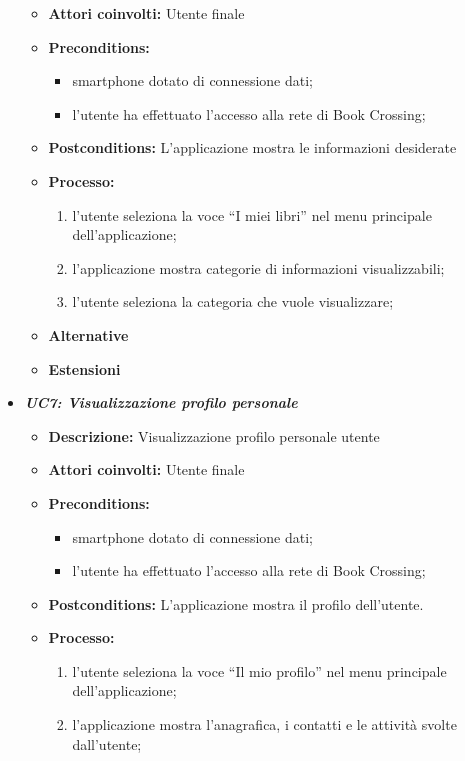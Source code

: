 \begin{itemize}
\begin{itemize}
		\item \textbf{Attori coinvolti:} Utente finale
		\item \textbf{Preconditions:}
		\begin{itemize}
			\item smartphone dotato di connessione dati;
			\item l’utente ha effettuato l’accesso alla rete di Book Crossing;
		\end{itemize}
		\item \textbf{Postconditions:} L’applicazione mostra le informazioni desiderate
		\item \textbf{Processo:}
		\begin{enumerate}
			\item l’utente seleziona la voce “I miei libri” nel menu principale dell’applicazione;
			\item l’applicazione mostra categorie di informazioni visualizzabili;
			\item l’utente seleziona la categoria che vuole visualizzare;
		\end{enumerate}
		\item \textbf{Alternative}
		\item \textbf{Estensioni}
	\end{itemize}
	\item \textbf{\textit{UC7: Visualizzazione profilo personale}}
	\begin{itemize}
		\item \textbf{Descrizione: } Visualizzazione profilo personale utente
		\item \textbf{Attori coinvolti:} Utente finale
		\item \textbf{Preconditions:}
		\begin{itemize}
			\item smartphone dotato di connessione dati;
			\item l’utente ha effettuato l’accesso alla rete di Book Crossing;
		\end{itemize}
		\item \textbf{Postconditions: }L’applicazione mostra il profilo dell’utente.
		\item \textbf{Processo: }
		\begin{enumerate}
			\item l’utente seleziona la voce “Il mio profilo” nel menu principale dell’applicazione;
			\item l’applicazione mostra l’anagrafica, i contatti e le attività svolte dall’utente;
		\end{enumerate}

\end{itemize}
\end{itemize}
